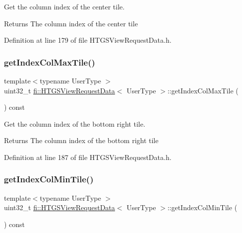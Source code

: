 Get the column index of the center tile. 

\begin{DoxyReturn}{Returns}
The column index of the center tile 
\end{DoxyReturn}


Definition at line 179 of file H\+T\+G\+S\+View\+Request\+Data.\+h.

\mbox{\label{classfi_1_1HTGSViewRequestData_a6185ba2ac51f76c3bf447c08c0c4c63f}} 
\subsubsection{\texorpdfstring{get\+Index\+Col\+Max\+Tile()}{getIndexColMaxTile()}}
{\footnotesize\ttfamily template$<$typename User\+Type $>$ \\
uint32\+\_\+t \hyperlink{classfi_1_1HTGSViewRequestData}{fi\+::\+H\+T\+G\+S\+View\+Request\+Data}$<$ User\+Type $>$\+::get\+Index\+Col\+Max\+Tile (\begin{DoxyParamCaption}{ }\end{DoxyParamCaption}) const\hspace{0.3cm}{\ttfamily [inline]}}



Get the column index of the bottom right tile. 

\begin{DoxyReturn}{Returns}
The column index of the bottom right tile 
\end{DoxyReturn}


Definition at line 187 of file H\+T\+G\+S\+View\+Request\+Data.\+h.

\mbox{\label{classfi_1_1HTGSViewRequestData_a61be0d71f0f014a4771370e7c36c018d}} 
\subsubsection{\texorpdfstring{get\+Index\+Col\+Min\+Tile()}{getIndexColMinTile()}}
{\footnotesize\ttfamily template$<$typename User\+Type $>$ \\
uint32\+\_\+t \hyperlink{classfi_1_1HTGSViewRequestData}{fi\+::\+H\+T\+G\+S\+View\+Request\+Data}$<$ User\+Type $>$\+::get\+Index\+Col\+Min\+Tile (\begin{DoxyParamCaption}{ }\end{DoxyParamCaption}) const\hspace{0.3cm}{\ttfamily [inline]}}



